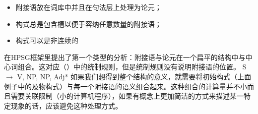 \begin{itemize}
\item 附接语放在词库中\citep*{NB94,BMS2001a}并且在句法层上处理为论元；
\item 构式总是包含槽以便于容纳任意数量的附接语；
\item 构式可以是非连续的
\end{itemize}
\citet{Kasper94a}在HPSG框架里提出了第一个类型的分析：附接语与论元在一个扁平的结构中与中心词组合。这对应（）中的统制规则，但是统制规则没有说明附接语的位置。
\ea
S $\to$ V, NP, NP, Adj*
\z
如果我们想得到整个结构的意义，就需要将初始构式（上面例子中的及物构式）与每一个附接语的语义组合起来。这种组合的计算量并不小而且需要关联限制（小的计算机程序），如果有概念上更加简洁的方式来描述某一特定现象的话，应该避免这种处理方式。

